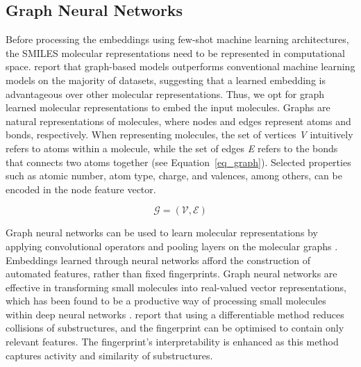 \documentclass[journal=acscii,manuscript=article]{achemso}
\begin{document}
\subsection{Graph Neural Networks}

Before processing the embeddings using few-shot machine learning architectures, the SMILES molecular representations need to be represented in computational space. \citet{wu2018moleculenet} report that graph-based models outperforms conventional machine learning models on the majority of datasets, suggesting that a learned embedding is advantageous over other molecular representations. Thus, we opt for graph learned molecular representations to embed the input molecules. Graphs are natural representations of molecules, where nodes and edges represent atoms and bonds, respectively. When representing molecules, the set of vertices \textit{V} intuitively refers to atoms within a molecule, while the set of edges \textit{E} refers to the bonds that connects two atoms together (see Equation~\ref{eq_graph}). Selected properties such as atomic number, atom type, charge, and valences, among others, can be encoded in the node feature vector.

\begin{equation}\label{eq_graph}
 \mathcal{G}=(\mathcal{V}, \mathcal{E})
\end{equation}

Graph neural networks can be used to learn molecular representations by applying convolutional operators and pooling layers on the molecular graphs \cite{jiang2021could}. Embeddings learned through neural networks afford the construction of automated features, rather than fixed fingerprints. Graph neural networks are effective in transforming small molecules into real-valued vector representations, which has been found to be a productive way of processing small molecules within deep neural networks \cite{gomez2018automatic}. \citet{duvenaud2015convolutional} report that using a differentiable method reduces collisions of substructures, and the fingerprint can be optimised to contain only relevant features. The fingerprint's interpretability is enhanced as this method captures activity and similarity of substructures.
\end{document}
